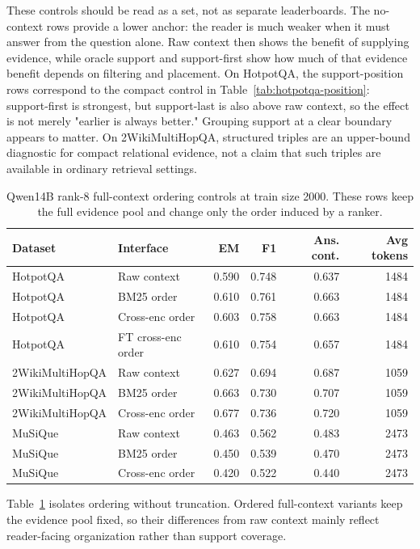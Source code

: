\documentclass[a4paper,fleqn]{cas-sc}
\begin{document}
These controls should be read as a set, not as separate leaderboards. The
no-context rows provide a lower anchor: the reader is much weaker when it must
answer from the question alone. Raw context then shows the benefit of supplying
evidence, while oracle support and support-first show how much of that evidence
benefit depends on filtering and placement. On HotpotQA, the support-position
rows correspond to the compact control in Table~\ref{tab:hotpotqa-position}:
support-first is strongest, but support-last is also above raw context, so the
effect is not merely "earlier is always better." Grouping support at a clear
boundary appears to matter. On 2WikiMultiHopQA, structured triples are an
upper-bound diagnostic for compact relational evidence, not a claim that such
triples are available in ordinary retrieval settings.

\begin{table}[!hbp]
\centering
\caption{Qwen14B rank-8 full-context ordering controls at train size 2000.
These rows keep the full evidence pool and change only the order induced by a
ranker.}
\label{tab:appendix-qwen14b-order-controls}
\scriptsize
\setlength{\tabcolsep}{4pt}
\begin{tabular}{llrrrr}
\toprule
Dataset & Interface & EM & F1 & Ans. cont. & Avg tokens \\
\midrule
HotpotQA & Raw context & 0.590 & 0.748 & 0.637 & 1484 \\
HotpotQA & BM25 order & 0.610 & 0.761 & 0.663 & 1484 \\
HotpotQA & Cross-enc order & 0.603 & 0.758 & 0.663 & 1484 \\
HotpotQA & FT cross-enc order & 0.610 & 0.754 & 0.657 & 1484 \\
\midrule
2WikiMultiHopQA & Raw context & 0.627 & 0.694 & 0.687 & 1059 \\
2WikiMultiHopQA & BM25 order & 0.663 & 0.730 & 0.707 & 1059 \\
2WikiMultiHopQA & Cross-enc order & 0.677 & 0.736 & 0.720 & 1059 \\
\midrule
MuSiQue & Raw context & 0.463 & 0.562 & 0.483 & 2473 \\
MuSiQue & BM25 order & 0.450 & 0.539 & 0.470 & 2473 \\
MuSiQue & Cross-enc order & 0.420 & 0.522 & 0.440 & 2473 \\
\bottomrule
\end{tabular}
\end{table}

Table~\ref{tab:appendix-qwen14b-order-controls} isolates ordering without
truncation. Ordered full-context variants keep the evidence pool fixed, so their
differences from raw context mainly reflect reader-facing organization rather
than support coverage.
\end{document}
